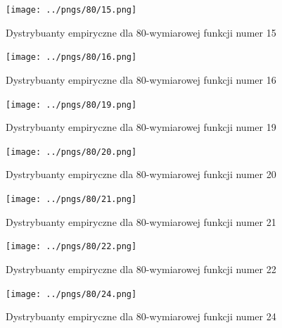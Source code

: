\documentclass[a4paper,onecolumn,oneside,12pt,wide,floatssmall]{mwrep}
\theoremstyle{definition}
\theoremstyle{plain}%
\theoremstyle{remark}
\begin{document}
\begin{figure}[H]
\centering
\texttt{[image: ../pngs/80/15.png]}
\caption{Dystrybuanty empiryczne dla 80-wymiarowej funkcji numer 15}
\end{figure}

\begin{figure}[H]
\centering
\texttt{[image: ../pngs/80/16.png]} 
\caption{Dystrybuanty empiryczne dla 80-wymiarowej funkcji numer 16}
\end{figure}

\begin{figure}[H]
\centering
\texttt{[image: ../pngs/80/19.png]}
\caption{Dystrybuanty empiryczne dla 80-wymiarowej funkcji numer 19}
\end{figure}

\begin{figure}[H]
\centering
\texttt{[image: ../pngs/80/20.png]}
\caption{Dystrybuanty empiryczne dla 80-wymiarowej funkcji numer 20}
\end{figure}

\begin{figure}[H]
\centering
\texttt{[image: ../pngs/80/21.png]}
\caption{Dystrybuanty empiryczne dla 80-wymiarowej funkcji numer 21}
\end{figure}

\begin{figure}[H]
\centering
\texttt{[image: ../pngs/80/22.png]}
\caption{Dystrybuanty empiryczne dla 80-wymiarowej funkcji numer 22}
\end{figure}

\begin{figure}[H]
\centering
\texttt{[image: ../pngs/80/24.png]}
\caption{Dystrybuanty empiryczne dla 80-wymiarowej funkcji numer 24}
\end{figure}

\nocite{*}


\end{document}
